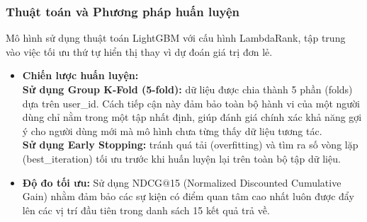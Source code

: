 \subsubsection{Thuật toán và Phương pháp huấn luyện}
\indent \indent Mô hình sử dụng thuật toán LightGBM với cấu hình LambdaRank, tập trung vào việc tối ưu thứ tự hiển thị thay vì dự đoán giá trị đơn lẻ.
\begin{itemize}
    \item[1.] \textbf{Chiến lược huấn luyện:}\\
    \textbf{Sử dụng Group K-Fold (5-fold):} dữ liệu được chia thành 5 phần (folds) dựa trên user\_id. Cách tiếp cận này đảm bảo toàn bộ hành vi của một người dùng chỉ nằm trong một tập nhất định, giúp đánh giá chính xác khả năng gợi ý cho người dùng mới mà mô hình chưa từng thấy dữ liệu tương tác.\\
    \textbf{Sử dụng Early Stopping:} tránh quá tải (overfitting) và tìm ra số vòng lặp (best\_iteration) tối ưu trước khi huấn luyện lại trên toàn bộ tập dữ liệu.
    \item[2.] \textbf{Độ đo tối ưu:} Sử dụng NDCG$@$15 (Normalized Discounted Cumulative Gain) nhằm đảm bảo các sự kiện có điểm quan tâm cao nhất luôn được đẩy lên các vị trí đầu tiên trong danh sách 15 kết quả trả về.
\end{itemize}


